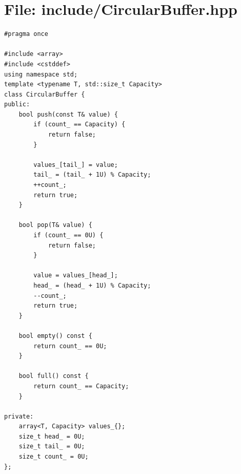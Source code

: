 \documentclass[11pt]{article}
\begin{document}
\section*{File: include/CircularBuffer.hpp}
\begin{lstlisting}[style=code]
#pragma once

#include <array>
#include <cstddef>
using namespace std;
template <typename T, std::size_t Capacity>
class CircularBuffer {
public:
    bool push(const T& value) {
        if (count_ == Capacity) {
            return false;
        }

        values_[tail_] = value;
        tail_ = (tail_ + 1U) % Capacity;
        ++count_;
        return true;
    }

    bool pop(T& value) {
        if (count_ == 0U) {
            return false;
        }

        value = values_[head_];
        head_ = (head_ + 1U) % Capacity;
        --count_;
        return true;
    }

    bool empty() const {
        return count_ == 0U;
    }

    bool full() const {
        return count_ == Capacity;
    }

private:
    array<T, Capacity> values_{};
    size_t head_ = 0U;
    size_t tail_ = 0U;
    size_t count_ = 0U;
};
\end{lstlisting}
\end{document}
